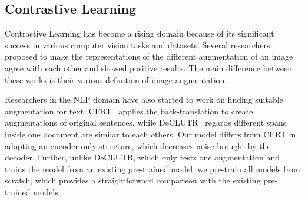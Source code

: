 \documentclass[11pt,a4paper]{article}
\begin{document}
\subsection{Contrastive Learning}
Contrastive Learning has become a rising domain because of its significant success in various computer vision tasks and datasets. Several researchers~\cite{zhuang2019local, tian2019contrastive, misra2020self, chen2020simple} proposed to make the representations of the different augmentation of an image agree with each other and showed positive results. The main difference between these works is their various definition of image augmentation.

Researchers in the NLP domain have also started to work on finding suitable augmentation for text. CERT~\cite{fang2020cert} applies the back-translation to create augmentations of original sentences, while DeCLUTR~\cite{giorgi2020declutr} regards different spans inside one document are similar to each others. Our model differs from CERT in adopting an encoder-only structure, which decreases noise brought by the decoder. Further, unlike DeCLUTR, which only tests one augmentation and trains the model from an existing pre-trained model, we pre-train all models from scratch, which provides a straightforward comparison with the existing pre-trained models.
 
\end{document}
